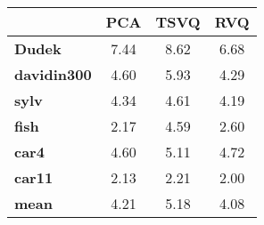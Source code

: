 \begin{tabular}{|l|c|c|c|}
\hline
&\textbf{PCA}&\textbf{TSVQ}&\textbf{RVQ}\\\hline
\textbf{Dudek}&7.44&8.62&6.68\\\hline
\textbf{davidin300}&4.60&5.93&4.29\\\hline
\textbf{sylv}&4.34&4.61&4.19\\\hline
\textbf{fish}&2.17&4.59&2.60\\\hline
\textbf{car4}&4.60&5.11&4.72\\\hline
\textbf{car11}&2.13&2.21&2.00\\\hline
\textbf{mean}&4.21&5.18&4.08\\\hline
\end{tabular}
